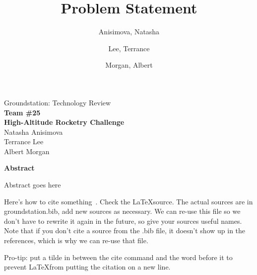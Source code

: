 \documentclass[10pt,draftclsnofoot,onecolumn]{IEEEtran}
\begin{document}
	\singlespace
	
	\title{\vspace{2in}Problem Statement}
	
	\author {
		Anisimova, Natasha
		\and
		Lee, Terrance
		\and
		Morgan, Albert
	}
	
	
	\pagestyle{empty}
	\vspace*{2in}
	\begin{center}
		\huge
		Groundstation: Technology Review\\
		\normalsize
		\vspace{5mm}
		\textbf{
			Team \#25\\
			High-Altitude Rocketry Challenge\\
		}
		\vspace{1mm}
		Natasha Anisimova\\
		Terrance Lee\\
		Albert Morgan
	\end{center}
	
	\vspace{5mm}
	
	\begin{center}
		\textbf{Abstract}
	\end{center}
	
	
	Abstract goes here
	
	
	\newpage
	
	Here's how to cite something~\cite{apache-usage-statistics}.
	Check the \LaTeX source.
	The actual sources are in groundstation.bib, add new sources as necessary.
	We can re-use this file so we don't have to rewrite it again in the future, so give your sources useful names.
	Note that if you don't cite a source from the .bib file, it doesn't show up in the references, which is why we can re-use that file.
	
	Pro-tip: put a tilde in between the cite command and the word before it to prevent \LaTeX from putting the citation on a new line.

	\newpage

	\tableofcontents
	\newpage
	
	\pagestyle{headings}
\end{document}
